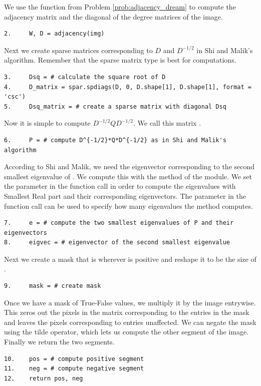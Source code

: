 We use the function  from Problem \ref{prob:adjacency_dream} to compute the adjacency matrix and the diagonal of the degree matrices of the image. 
\begin{lstlisting}
2.     W, D = adjacency(img)
\end{lstlisting}

Next we create sparse matrices corresponding to $D$ and $D^{-1/2}$ in Shi and Malik's algorithm. Remember that the sparse matrix type  is best for computations.
\begin{lstlisting}
3.     Dsq = # calculate the square root of D
4.     D_matrix = spar.spdiags(D, 0, D.shape[1], D.shape[1], format = 'csc')
5.     Dsq_matrix = # create a sparse matrix with diagonal Dsq
\end{lstlisting}
Now it is simple to compute $D^{-1/2}QD^{-1/2}$. We call this matrix .
\begin{lstlisting}
6.     P = # compute D^{-1/2}*Q*D^{-1/2} as in Shi and Malik's algorithm
\end{lstlisting}
According to Shi and Malik, we need the eigenvector corresponding to the second smallest eigenvalue of . We compute this with the  method of the  module. We set the parameter  in the function call in order to compute the eigenvalues with Smallest Real part and their corresponding eigenvectors. The parameter  in the function call can be used to specify how many eigenvalues the method computes.
\begin{lstlisting}
7.     e = # compute the two smallest eigenvalues of P and their eigenvectors
8.     eigvec = # eigenvector of the second smallest eigenvalue
\end{lstlisting}

Next we create a mask that is  wherever  is positive and reshape it to be the size of . 
\begin{lstlisting}
9.     mask = # create mask
\end{lstlisting}
Once we have a mask of True-False values, we multiply it by the image entrywise. This zeros out the pixels in the matrix corresponding to the  entries in the mask and leaves the pixels corresponding to  entries unaffected. We can negate the mask using the tilde operator, which lets us compute the other segment of the image. Finally we return the two segments.
\begin{lstlisting}
10.    pos = # compute positive segment
11.    neg = # compute negative segment
12.    return pos, neg
\end{lstlisting}



